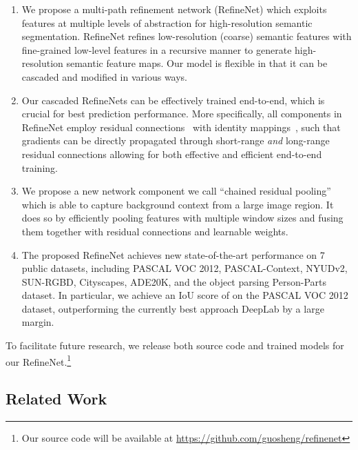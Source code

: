 \documentclass[10pt,twocolumn,letterpaper]{article}
\begin{document}
\begin{enumerate}

  \item We propose a multi-path refinement network (RefineNet) 
  which exploits features at multiple levels of abstraction for high-resolution semantic segmentation. 
  RefineNet refines low-resolution (coarse) semantic features with fine-grained low-level features in a recursive manner to generate high-resolution semantic feature maps. Our model is flexible in that it can be cascaded and modified in various ways. 

  \item 
  Our cascaded RefineNets can be effectively trained end-to-end, which is crucial for best prediction performance.
  More specifically, all components in RefineNet employ residual connections~\cite{He:2016:ResNet} with identity mappings~\cite{he2016identity},
  such that gradients can be directly propagated through short-range {\em and} long-range residual connections allowing for both effective and efficient end-to-end training.


  \item We propose a new network component we call ``chained residual pooling'' which is able to capture background context from a large image region.
	It does so by efficiently pooling features with multiple window sizes and fusing them together with residual connections and learnable weights.
   

  \item The proposed RefineNet achieves new state-of-the-art performance on 7 public datasets, including PASCAL VOC 2012, PASCAL-Context, NYUDv2, SUN-RGBD, Cityscapes, ADE20K, and the object parsing Person-Parts dataset. 
	In particular, we achieve an IoU score of  on the PASCAL VOC 2012 dataset, outperforming the currently best approach DeepLab by a large margin.
  
\end{enumerate}

To facilitate future research,
we release both source code and trained models for our RefineNet.\footnote{Our source code will be available at \url{https://github.com/guosheng/refinenet}}





 \subsection{Related Work}
\label{sec:related-work}
\end{document}
